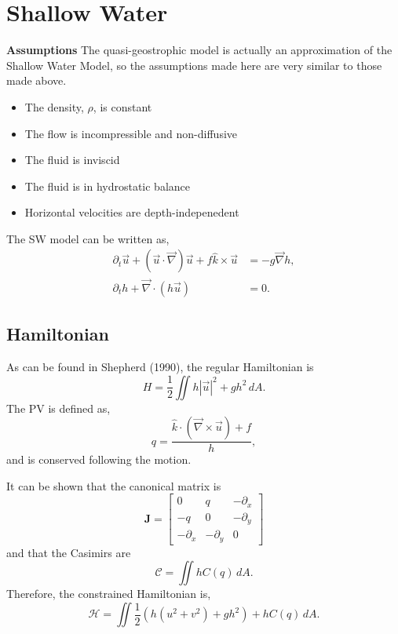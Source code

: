 \documentclass[12pt]{article}
\begin{document}
\newpage
\section{Shallow Water}{
    \textbf{Assumptions}
    The quasi-geostrophic model is actually an approximation of the Shallow Water Model, so the assumptions made here are very similar to those made above.
    \begin{itemize}
        \item The density, $\rho$, is constant
        \item The flow is incompressible and non-diffusive
        \item The fluid is inviscid
        \item The fluid is in hydrostatic balance
        \item Horizontal velocities are depth-indepenedent
    \end{itemize}

    The SW model can be written as,
    \begin{align*}
        \partial_t \vec u + (\vec u \cdot \vec \nabla) \vec u + f \hat k \times \vec u &= - g \vec \nabla h, \\
        \partial_t h + \vec\nabla \cdot \left( h \vec u \right) & = 0.
    \end{align*}

    \subsection{Hamiltonian}{
        As can be found in Shepherd (1990), the regular Hamiltonian is
        $$
        H = \frac12 \iint h | \vec u |^2 + g h^2 \, dA.
        $$
        The PV is defined as,
        $$
        q = \frac{ \hat k \cdot (\vec \nabla \times \vec u) + f}{h},
        $$
        and is conserved following the motion.

        It can be shown that the canonical matrix is
        $$
        \mathbf{J} = \left[\begin{array}{ccc}
        0 & q & -\partial_x \\
        -q & 0 & -\partial_y \\
        -\partial_x & -\partial_y & 0
        \end{array}\right]
        $$
        and that the Casimirs are
        $$
        \mathcal{C} = \iint hC(q) \, dA.
        $$
        Therefore, the constrained Hamiltonian is,
        $$
        \mathcal{H} =  \iint \frac12  \left( h (u^2 + v^2) + g h^2 \right) + h C(q) \, dA.
        $$
    }

}
\end{document}
